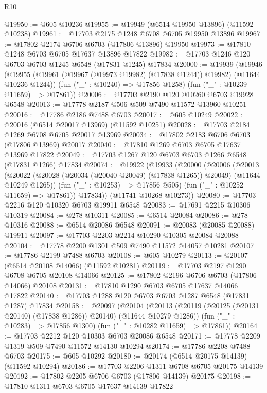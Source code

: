 \begin{lexlean}{R10}
\begin{coremodule}
@19950 := @605 @10236
@19955 := @19949 (@6514 @19950 @13896) (@11592 @10238)
@19961 := @17703 @2175 @1248 @6708 @6705 @19950 @13896
@19967 := @17802 @2174 @6706 @6703 (@17806 @13896) @19950
@19973 := @17810 @1248 @6703 @6705 @17637 @13896 @17822
@19982 := @17703 @1246 @120 @6703 @6703 @1245 @6548 (@17831 @1245) @17834
@20000 := @19939
    (@19946
      (@19955 (@19961 (@19967 (@19973 @19982) (@17838 @1244)) @19982) (@11644 @10236 @1244))
      (fun ("_" : @10240) => @17856 @1258)
      (fun ("_" : @10239 @11659) => @17861))
@20006 := @17703 @2190 @120 @10260 @6703 @19928 @6548
@20013 := @17778 @2187 @506 @509 @7490 @11572 @13960 @10251
@20016 := @17786 @2186 @7488 @6703
@20017 := @605 @10249
@20022 := @20016 (@6514 @20017 @13969) (@11592 @10251)
@20028 := @17703 @2184 @1269 @6708 @6705 @20017 @13969
@20034 := @17802 @2183 @6706 @6703 (@17806 @13969) @20017
@20040 := @17810 @1269 @6703 @6705 @17637 @13969 @17822
@20049 := @17703 @1267 @120 @6703 @6703 @1266 @6548 (@17831 @1266) @17834
@20074 := @19922
    (@19933
      (@20000
        (@20006
          (@20013
            (@20022 (@20028 (@20034 (@20040 @20049) (@17838 @1265)) @20049) (@11644 @10249 @1265))
            (fun ("_" : @10253) => @17856 @505)
            (fun ("_" : @10252 @11659) => @17861))
          @17834))
      (@11741 @10268 @10273))
@20080 := @17703 @2216 @120 @10320 @6703 @19911 @6548
@20083 := @17691 @2215 @10306 @10319
@20084 := @278 @10311
@20085 := @6514 @20084
@20086 := @278 @10316
@20088 := @6514 @20086 @6548
@20091 := @20083 (@20085 @20088) @19911
@20097 := @17703 @2203 @2214 @10290 @10305 @20084 @20088
@20104 := @17778 @2200 @1301 @509 @7490 @11572 @14057 @10281
@20107 := @17786 @2199 @7488 @6703
@20108 := @605 @10279
@20113 := @20107 (@6514 @20108 @14066) (@11592 @10281)
@20119 := @17703 @2197 @1290 @6708 @6705 @20108 @14066
@20125 := @17802 @2196 @6706 @6703 (@17806 @14066) @20108
@20131 := @17810 @1290 @6703 @6705 @17637 @14066 @17822
@20140 := @17703 @1288 @120 @6703 @6703 @1287 @6548 (@17831 @1287) @17834
@20158 := @20097
    (@20104
      (@20113 (@20119 (@20125 (@20131 @20140) (@17838 @1286)) @20140) (@11644 @10279 @1286))
      (fun ("_" : @10283) => @17856 @1300)
      (fun ("_" : @10282 @11659) => @17861))
@20164 := @17703 @2212 @120 @10303 @6703 @20086 @6548
@20171 := @17778 @2209 @1319 @509 @7490 @11572 @14130 @10294
@20174 := @17786 @2208 @7488 @6703
@20175 := @605 @10292
@20180 := @20174 (@6514 @20175 @14139) (@11592 @10294)
@20186 := @17703 @2206 @1311 @6708 @6705 @20175 @14139
@20192 := @17802 @2205 @6706 @6703 (@17806 @14139) @20175
@20198 := @17810 @1311 @6703 @6705 @17637 @14139 @17822

\end{coremodule}
\end{lexlean}
